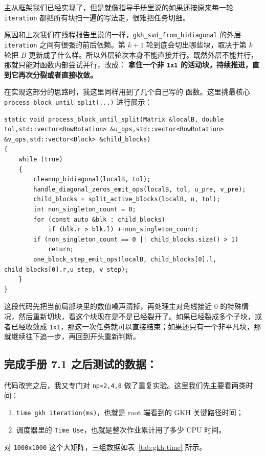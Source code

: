 \documentclass[12pt,a4paper,fontset=none]{ctexart}
\begin{document}
主从框架我们已经实现了，但是就像指导手册里说的如果还按原来每一轮 \texttt{iteration}
都把所有块扫一遍的写法走，很难把任务切细。

原因和上次我们在线程报告里说的一样，\texttt{gkh\_svd\_from\_bidiagonal} 的外层 \texttt{iteration} 之间有很强的前后依赖。第 \(k+1\) 轮到底会切出哪些块，取决于第 \(k\) 轮把 \(B\) 更新成了什么样。所以外层轮次本身不能直接并行。既然外层不能并行，那就只能对函数内部尝试并行，改成：
\textbf{拿住一个非 \texttt{1x1} 的活动块，持续推进，直到它再次分裂或者直接收敛。}

在实现这部分的思路时，我这里同样用到了几个自己写的
函数。这里挑最核心
\texttt{process\_block\_until\_split(...)} 进行展示：

\begin{lstlisting}
static void process_block_until_split(Matrix &localB, double tol,std::vector<RowRotation> &u_ops,std::vector<RowRotation> &v_ops,std::vector<Block> &child_blocks)
{
    while (true)
    {
        cleanup_bidiagonal(localB, tol);
        handle_diagonal_zeros_emit_ops(localB, tol, u_pre, v_pre);
        child_blocks = split_active_blocks(localB, n, tol);
        int non_singleton_count = 0;
        for (const auto &blk : child_blocks)
            if (blk.r > blk.l) ++non_singleton_count;
        if (non_singleton_count == 0 || child_blocks.size() > 1)
            return;
        one_block_step_emit_ops(localB, child_blocks[0].l, child_blocks[0].r,u_step, v_step);
    }
}
\end{lstlisting}

这段代码先把当前局部块里的数值噪声清掉，再处理主对角线接近 \(0\) 的特殊情况，然后重新切块，看这个块现在是不是已经裂开了。如果已经裂成多个子块，或者已经收敛成 \texttt{1x1}，那这一次任务就可以直接结束；如果还只有一个非平凡块，那就继续往下追一步，再回到开头重新判断。

\subsection{完成手册 7.1 之后测试的数据：}

代码改完之后，我又专门对 \texttt{np=2,4,8} 做了重复实验。这里我们先主要看两类时间：
\begin{enumerate}
    \item \texttt{time gkh iteration(ms)}，也就是 root 端看到的 GKH 关键路径时间；
    \item 调度器里的 \texttt{Time Use}，也就是整次作业累计用了多少 CPU 时间。
\end{enumerate}

对 \texttt{1000x1000} 这个大矩阵，三组数据如表~\ref{tab:gkh-time} 所示。
\end{document}
